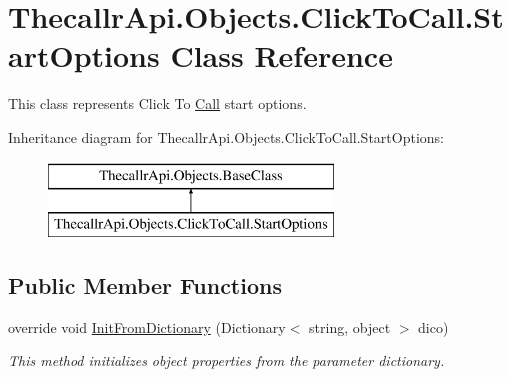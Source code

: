 \hypertarget{class_thecallr_api_1_1_objects_1_1_click_to_call_1_1_start_options}{\section{Thecallr\+Api.\+Objects.\+Click\+To\+Call.\+Start\+Options Class Reference}
\label{class_thecallr_api_1_1_objects_1_1_click_to_call_1_1_start_options}
}


This class represents Click To \hyperlink{class_thecallr_api_1_1_objects_1_1_click_to_call_1_1_call}{Call} start options.  


Inheritance diagram for Thecallr\+Api.\+Objects.\+Click\+To\+Call.\+Start\+Options\+:\begin{figure}[H]
\begin{center}
\leavevmode
\includegraphics[height=2.000000cm]{class_thecallr_api_1_1_objects_1_1_click_to_call_1_1_start_options}
\end{center}
\end{figure}
\subsection*{Public Member Functions}
\begin{DoxyCompactItemize}
\item 
override void \hyperlink{class_thecallr_api_1_1_objects_1_1_click_to_call_1_1_start_options_a64b5b09fd65d4347eb5e03a2a191d42e}{Init\+From\+Dictionary} (Dictionary$<$ string, object $>$ dico)
\begin{DoxyCompactList}\small\item\em This method initializes object properties from the parameter dictionary. \end{DoxyCompactList}\end{DoxyCompactItemize}
